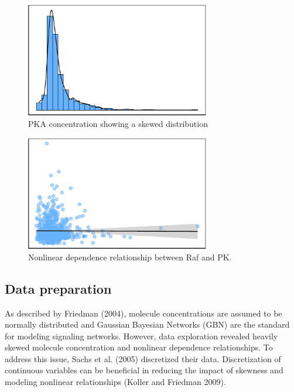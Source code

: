 \documentclass[twocol]{ametsoc}
\begin{document}
\begin{figure}[h]
 \centerline{\includegraphics[width=19pc]{images/skewed_dist.pdf}}
  \caption{PKA concentration showing a skewed distribution}\label{f2}
\end{figure}

\begin{figure}[h]
 \centerline{\includegraphics[width=19pc]{images/nonlinear_rel.pdf}}
  \caption{Nonlinear dependence relationship between Raf and PK.}\label{f3}
\end{figure}

\hypertarget{data-preparation}{%
\subsection{Data preparation}\label{data-preparation}}

As described by Friedman (2004), molecule concentrations are assumed to
be normally distributed and Gaussian Bayesian Networks (GBN) are the
standard for modeling signaling networks. However, data exploration
revealed heavily skewed molecule concentration and nonlinear dependence
relationships. To address this issue, Sachs et al. (2005) discretized
their data. Discretization of continuous variables can be beneficial in
reducing the impact of skewness and modeling nonlinear relationships
(Koller and Friedman 2009).
\end{document}
